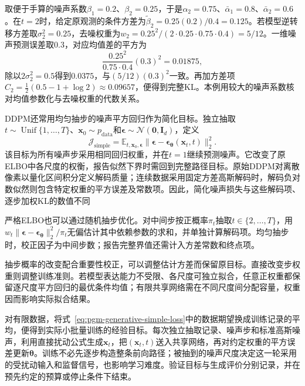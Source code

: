 \begin{example}[核对一个扩散步的权重]
  \label{ex:pgm-generative-step-weight}
  取便于手算的噪声系数$\beta_1=0.2$、$\beta_2=0.25$，于是$\alpha_2=0.75$、$\bar{\alpha}_1=0.8$、$\bar{\alpha}_2=0.6$。在$t=2$时，给定原观测的条件方差为$\widetilde{\beta}_2=0.25(0.2)/0.4=0.125$。若模型逆转移方差取$\sigma_2^2=0.25$，去噪权重为$w_2=0.25^2/(2\cdot0.25\cdot0.75\cdot0.4)=5/12$。一维噪声预测误差取$0.3$，对应均值差的平方为
  \[
    \frac{0.25^2}{0.75\cdot0.4}(0.3)^2=0.01875,
  \]
  除以$2\sigma_2^2=0.5$得到$0.0375$，与$(5/12)(0.3)^2$一致。再加方差项$C_2=\tfrac12(0.5-1+\log2)\approx0.09657$，便得到完整KL。本例用较大的噪声系数核对均值参数化与去噪权重的代数关系。
\end{example}

DDPM还常用均匀抽步的噪声平方回归作为简化目标。独立抽取$t\sim\operatorname{Unif}\{1,\ldots,T\}$、$\bm{x}_0\sim p_{\mathrm{data}}$和$\bm{\epsilon}\sim\mathcal{N}(\bm{0},\bm{I}_d)$，定义
\begin{equation}
  \label{eq:pgm-generative-simple-loss}
  \mathcal{J}_{\mathrm{simple}}
  =\mathbb{E}_{t,\bm{x}_0,\bm{\epsilon}}
      \lVert\bm{\epsilon}
       -\bm{\epsilon}_{\bm{\theta}}(\bm{x}_t,t)\rVert_2^2.
\end{equation}
该目标为所有噪声步采用相同回归权重，并在$t=1$继续预测噪声。它改变了原ELBO中各尺度的权衡，报告似然下界时需回到完整路径目标。原始DDPM对离散像素以量化区间积分定义解码质量；连续数据采用固定方差高斯解码时，解码负对数似然则包含特定权重的平方误差及常数项。因此，简化噪声损失与这些解码项、逐步加权KL的数值不同

严格ELBO也可以通过随机抽步优化。对中间步按正概率$\pi_t$抽取$t\in\{2,\ldots,T\}$，用$w_t\lVert\bm{\epsilon}-\bm{\epsilon}_{\bm{\theta}}\rVert_2^2/\pi_t$无偏估计其中依赖参数的求和，并单独计算解码项。均匀抽步时，校正因子为中间步数；报告完整界值还需计入方差常数和终点项。

抽步概率的改变配合重要性校正，可以调整估计方差而保留原目标。直接改变步权重则调整训练准则。若模型表达能力不受限、各尺度可独立拟合，任意正权重都保留逐尺度平方回归的最优条件均值；有限共享网络需在不同尺度间分配容量，权重因而影响实际拟合结果。

对有限数据，将式~\eqref{eq:pgm-generative-simple-loss}中的数据期望换成训练记录的平均，便得到实际小批量训练的经验目标。每次独立抽取记录、噪声步和标准高斯噪声，利用直接扰动公式生成$\bm x_t$，把$(\bm x_t,t)$送入共享网络，再对约定权重的平方误差更新$\bm\theta$。训练不必先逐步构造整条前向路径；被抽到的噪声尺度决定这一轮采用的受扰动输入和监督信号，也影响学习难度。验证目标与生成评价分别记录，并在预先约定的预算或停止条件下结束。

